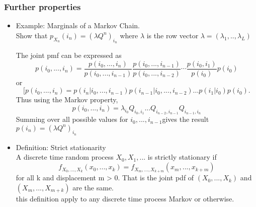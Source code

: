 \documentclass[12pt]{article}
\begin{document}
\subsubsection{Further properties}
\begin{itemize}
\item Example: Marginals of a Markov Chain.\\
Show that $p_{X_n}(i_n) = (\lambda Q^n)_{i_n}$ where $\lambda$ is the row vector  $\lambda = (\lambda_1,..,\lambda_L)$

The joint pmf can be expressed as 
\[p(i_0,...,i_n) = \frac{p(i_0,...,i_n)}{p(i_0,...,i_{n-1})} \frac{p(i_0,...,i_{n-1})}{p(i_0,...,i_{n-2})}\cdots \frac{p(i_0,i_1)}{p(i_0)} p(i_0)\]
or 
\[
[p(i_0,...,i_n) = p(i_n|i_0,...,i_{n-1})p(i_{n-1}|i_0,...,i_{n-2})...p(i_1|i_0)p(i_0).
\]
Thus using the Markov property,
\[
p(i_0,...,i_n) = \lambda_{i_0}Q_{i_0,i_1}...Q_{i_{n-2},i_{n-1}}Q_{i_{n-1},i_{n}}
\]
Summing over all possible values for $i_0,...,i_{n-1}$gives the result $p(i_n)=(\lambda Q^n)_{i_n}$

\item Definition: Strict stationarity \\
A discrete time random process $X_0,X_1,...$ is strictly stationary if 
\[
f_{X_0,...,X_k}(x_0,...,x_k) = f_{X_m,...,X_{k+m}}(x_m,...,x_{k+m})
\]
for all k and displacement m > 0. That is the joint pdf of $(X_0,...,X_k)$ and $(X_m,...,X_{m+k})$ are the same. \\
this definition apply to any discrete time process Markov or otherwise. 
\end{itemize}
\end{document}
